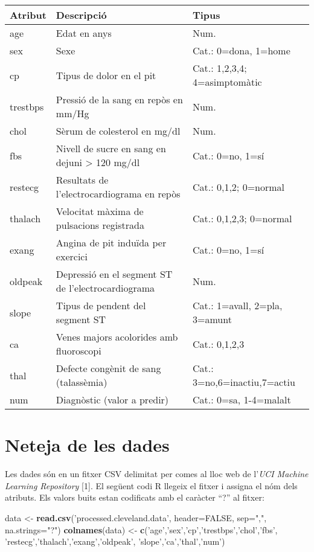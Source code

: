\documentclass[12,]{article}
\newenvironment{Shaded}{\begin{snugshade}}{\end{snugshade}}
\newcommand{\DataTypeTok}[1]{\textcolor[rgb]{0.13,0.29,0.53}{#1}}
\newcommand{\KeywordTok}[1]{\textcolor[rgb]{0.13,0.29,0.53}{\textbf{#1}}}
\newcommand{\NormalTok}[1]{#1}
\newcommand{\OtherTok}[1]{\textcolor[rgb]{0.56,0.35,0.01}{#1}}
\newcommand{\StringTok}[1]{\textcolor[rgb]{0.31,0.60,0.02}{#1}}
\begin{document}
\begin{longtable}[]{@{}lll@{}}
\toprule
Atribut & Descripció & Tipus\tabularnewline
\midrule
\endhead
age & Edat en anys & Num.\tabularnewline
sex & Sexe & Cat.: 0=dona, 1=home\tabularnewline
cp & Tipus de dolor en el pit & Cat.: 1,2,3,4;
4=asimptomàtic\tabularnewline
trestbps & Pressió de la sang en repòs en mm/Hg & Num.\tabularnewline
chol & Sèrum de colesterol en mg/dl & Num.\tabularnewline
fbs & Nivell de sucre en sang en dejuni \textgreater{} 120 mg/dl & Cat.:
0=no, 1=sí\tabularnewline
restecg & Resultats de l'electrocardiograma en repòs & Cat.: 0,1,2;
0=normal\tabularnewline
thalach & Velocitat màxima de pulsacions registrada & Cat.: 0,1,2,3;
0=normal\tabularnewline
exang & Angina de pit induïda per exercici & Cat.: 0=no,
1=sí\tabularnewline
oldpeak & Depressió en el segment ST de l'electrocardiograma &
Num.\tabularnewline
slope & Tipus de pendent del segment ST & Cat.: 1=avall, 2=pla,
3=amunt\tabularnewline
ca & Venes majors acolorides amb fluoroscopi & Cat.:
0,1,2,3\tabularnewline
thal & Defecte congènit de sang (talassèmia) & Cat.:
3=no,6=inactiu,7=actiu\tabularnewline
num & Diagnòstic (valor a predir) & Cat.: 0=sa,
1-4=malalt\tabularnewline
\bottomrule
\end{longtable}

\hypertarget{neteja-de-les-dades}{%
\section{Neteja de les dades}\label{neteja-de-les-dades}}

Les dades són en un fitxer CSV delimitat per comes al lloc web de
l'\emph{UCI Machine Learning Repository} {[}1{]}. El següent codi R
llegeix el fitxer i assigna el nóm dels atributs. Els valors buits estan
codificats amb el caràcter ``?'' al fitxer:

\begin{Shaded}
\begin{Highlighting}[]
\NormalTok{data <-}\StringTok{ }\KeywordTok{read.csv}\NormalTok{(}\StringTok{'processed.cleveland.data'}\NormalTok{, }\DataTypeTok{header=}\OtherTok{FALSE}\NormalTok{, }
                 \DataTypeTok{sep=}\StringTok{","}\NormalTok{, }\DataTypeTok{na.strings=}\StringTok{"?"}\NormalTok{)}
\KeywordTok{colnames}\NormalTok{(data) <-}\StringTok{ }\KeywordTok{c}\NormalTok{(}\StringTok{'age'}\NormalTok{,}\StringTok{'sex'}\NormalTok{,}\StringTok{'cp'}\NormalTok{,}\StringTok{'trestbps'}\NormalTok{,}\StringTok{'chol'}\NormalTok{,}\StringTok{'fbs'}\NormalTok{,}
                    \StringTok{'restecg'}\NormalTok{,}\StringTok{'thalach'}\NormalTok{,}\StringTok{'exang'}\NormalTok{,}\StringTok{'oldpeak'}\NormalTok{,}
                    \StringTok{'slope'}\NormalTok{,}\StringTok{'ca'}\NormalTok{,}\StringTok{'thal'}\NormalTok{,}\StringTok{'num'}\NormalTok{)}
\end{Highlighting}
\end{Shaded}
\end{document}
